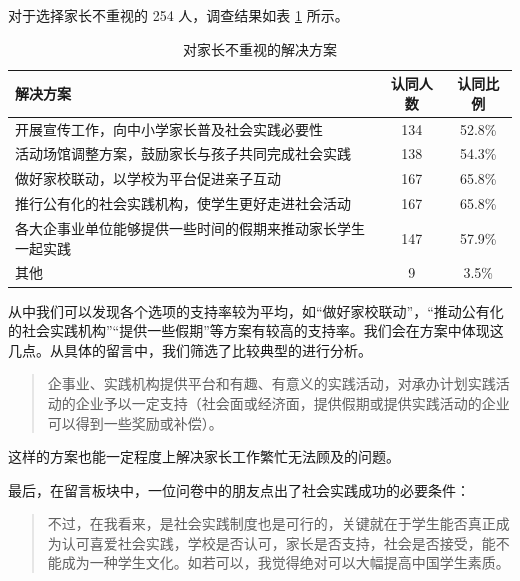 \documentclass[12pt,UTF8]{ctexart}
\begin{document}
\par {
	对于选择家长不重视的 254 人，调查结果如表 \ref{fig:13} 所示。
	\begin{table}[htbp]
		\centering
		\caption{对家长不重视的解决方案}
		\label{fig:13}
		\begin{tabular}{lcc}
			\hline
			\hline
			{\bf 解决方案} & {\bf 认同人数} & {\bf 认同比例}\\ \hline
			开展宣传工作，向中小学家长普及社会实践必要性 & 134 & 52.8\% \\
			活动场馆调整方案，鼓励家长与孩子共同完成社会实践 & 138 & 54.3\% \\
			做好家校联动，以学校为平台促进亲子互动 & 167 & 65.8\% \\
			推行公有化的社会实践机构，使学生更好走进社会活动 & 167 & 65.8\% \\
			各大企事业单位能够提供一些时间的假期来推动家长学生一起实践 & 147 & 57.9\% \\
			其他 & 9 & 3.5\% \\
			\hline
			\hline
		\end{tabular}
	\end{table}
	
	从中我们可以发现各个选项的支持率较为平均，如“做好家校联动”，“推动公有化的社会实践机构”“提供一些假期”等方案有较高的支持率。我们会在方案中体现这几点。从具体的留言中，我们筛选了比较典型的进行分析。
	\begin{quote}
		\kaishu
		企事业、实践机构提供平台和有趣、有意义的实践活动，对承办计划实践活动的企业予以一定支持（社会面或经济面，提供假期或提供实践活动的企业可以得到一些奖励或补偿）。
	\end{quote}
	这样的方案也能一定程度上解决家长工作繁忙无法顾及的问题。
}
\par {
	最后，在留言板块中，一位问卷中的朋友点出了社会实践成功的必要条件：
	\begin{quote}
		\kaishu
		不过，在我看来，是社会实践制度也是可行的，关键就在于学生能否真正成为认可喜爱社会实践，学校是否认可，家长是否支持，社会是否接受，能不能成为一种学生文化。如若可以，我觉得绝对可以大幅提高中国学生素质。
	\end{quote}
}
\end{document}
